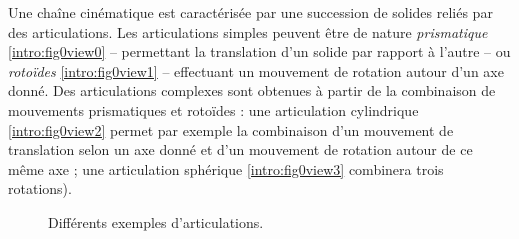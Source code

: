 Une cha\^ine cin\'ematique est caract\'eris\'ee par une succession de solides reli\'es par des articulations. Les articulations simples peuvent \^etre de nature {\it prismatique} \ref{intro:fig0view0} -- permettant la translation d'un solide par rapport \`a l'autre -- ou {\it roto\"ides} \ref{intro:fig0view1} -- effectuant un mouvement de rotation autour d'un axe donn\'e. Des articulations complexes sont obtenues \`a partir de la combinaison de mouvements prismatiques et roto\"ides : une articulation cylindrique \ref{intro:fig0view2} permet par exemple la combinaison d'un mouvement de translation selon un axe donn\'e et d'un mouvement de rotation autour de ce m\^eme axe ; une articulation sph\'erique \ref{intro:fig0view3} combinera trois rotations).

\begin{figure}[!h]
  \centering
       \hfill
     \hfill
   \hfill
    \caption{\footnotesize{Diff\'erents exemples d'articulations.}}
\label{intro:fig0}
\end{figure}

